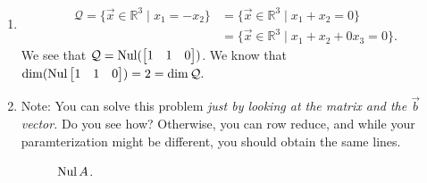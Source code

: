 \begin{enumerate}
\begin{align*}
		\end{align*}
		So, \(\mathcal{C} = \vspan \left\{\!\begin{pmatrix}1 \\ 1 \\ 0\end{pmatrix}, \begin{pmatrix}0 \\ 1 \\ 1\end{pmatrix}\!\right\}\). This is a 2-dimensional
		subspace.
	\item[\textbf{Q8}]
		\begin{align*}
			\mathcal{Q} = \{\vec{x} \in \mathbb{R}^3 \mid x_1 = -x_2\} &= \{\vec{x} \in \mathbb{R}^3 \mid x_1 + x_2 = 0\} \\
					 &= \{\vec{x} \in \mathbb{R}^3 \mid x_1 + x_2 + 0x_3 = 0\}.
		\end{align*}
		We see that \(\mathcal{Q} = \operatorname{Nul}(\begin{bmatrix}1 & 1 & 0\end{bmatrix})\). We know that \(\dim(\operatorname{Nul} \begin{bmatrix}1 & 1 & 0\end{bmatrix}) = 2 = \dim \mathcal{Q}.\)

	\item[\textbf{Q9}] Note: You can solve this problem \emph{just by looking at the matrix and the \(\vec{b}\) vector.} Do you see how? Otherwise, you can
			row reduce, and while your paramterization might be different, you should obtain the same lines.
		\begin{figure}[!h]
			\centering
			\begin{minipage}{0.33\textwidth}
				\centering
				\caption{\(\operatorname{Nul} A\).}
			\end{minipage}\hfill
			\begin{minipage}{0.33\textwidth}
				\centering


\end{minipage}
\end{figure}
\end{enumerate}
